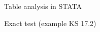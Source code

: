 \documentclass[compress, notes=hide]{beamer}
\begin{document}
\begin{frame}[fragile]{Table analysis in STATA}
	\begin{block}{Exact test (example KS 17.2)}
		
		\begin{figure}[H]
			\begin{center}
				{}
			\end{center}
		\end{figure}
		
	\end{block}
\end{frame}

%
\end{document}
